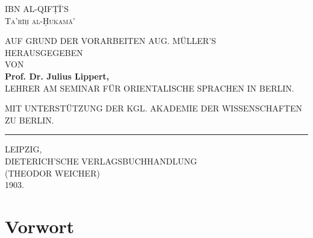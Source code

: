 \documentclass[11pt,a4paper]{article}
\newcommand{\shortline}{\noindent\rule{0.5\textwidth}{0.4pt}\par}
\begin{document}
\thispagestyle{empty}

\begin{center}
\vspace*{2cm}

{\LARGE\scshape IBN AL-QIFṬĪ'S}\\[0.8cm]
{\Huge\scshape Ta'rīḥ al-Ḥukamā'}\\[1.5cm]

\vspace{1.5cm}

{\large AUF GRUND DER VORARBEITEN AUG. MÜLLER'S}\\[0.3cm]
{\large HERAUSGEGEBEN}\\[0.8cm]
{\large VON}\\[0.8cm]
{\Large\bfseries Prof. Dr. Julius Lippert,}\\[0.3cm]
{\small LEHRER AM SEMINAR FÜR ORIENTALISCHE SPRACHEN IN BERLIN.}\\[1.5cm]

\vspace{1cm}

{\small MIT UNTERSTÜTZUNG DER KGL. AKADEMIE DER WISSENSCHAFTEN ZU BERLIN.}\\[2cm]

\shortline
\vspace{0.3cm}
{\Large LEIPZIG,}\\[0.2cm]
{\large DIETERICH'SCHE VERLAGSBUCHHANDLUNG}\\[0.1cm]
{\small (THEODOR WEICHER)}\\[0.3cm]
{\large 1903.}

\end{center}

\newpage

\tableofcontents
\newpage

\section*{Vorwort}
\end{document}
